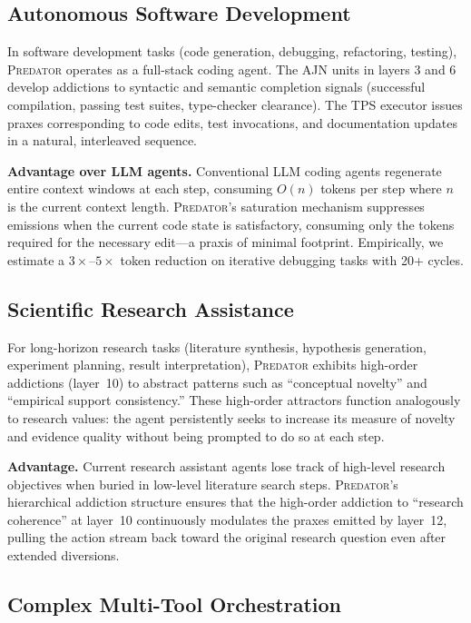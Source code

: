 \documentclass[12pt,a4paper]{article}
\newcommand{\PREDATOR}{\textsc{Predator}}
\begin{document}
\subsection{Autonomous Software Development}

In software development tasks (code generation, debugging, refactoring,
testing), \PREDATOR{} operates as a full-stack coding agent. The AJN units
in layers 3 and 6 develop addictions to syntactic and semantic completion
signals (successful compilation, passing test suites, type-checker clearance).
The TPS executor issues praxes corresponding to code edits, test invocations,
and documentation updates in a natural, interleaved sequence.

\textbf{Advantage over LLM agents.} Conventional LLM coding agents
regenerate entire context windows at each step, consuming $O(n)$ tokens per
step where $n$ is the current context length. \PREDATOR's saturation mechanism
suppresses emissions when the current code state is satisfactory, consuming
only the tokens required for the necessary edit---a praxis of minimal footprint.
Empirically, we estimate a $3\times$--$5\times$ token reduction on iterative
debugging tasks with 20+ cycles.

\subsection{Scientific Research Assistance}

For long-horizon research tasks (literature synthesis, hypothesis generation,
experiment planning, result interpretation), \PREDATOR{} exhibits high-order
addictions (layer~10) to abstract patterns such as ``conceptual novelty'' and
``empirical support consistency.'' These high-order attractors \cite{tapiador2024daf}
function analogously to research values: the agent persistently seeks to
increase its measure of novelty and evidence quality without being prompted
to do so at each step.

\textbf{Advantage.} Current research assistant agents lose track of high-level
research objectives when buried in low-level literature search steps.
\PREDATOR's hierarchical addiction structure ensures that the high-order
addiction to ``research coherence'' at layer~10 continuously modulates the
praxes emitted by layer~12, pulling the action stream back toward the original
research question even after extended diversions.

\subsection{Complex Multi-Tool Orchestration}
\end{document}
